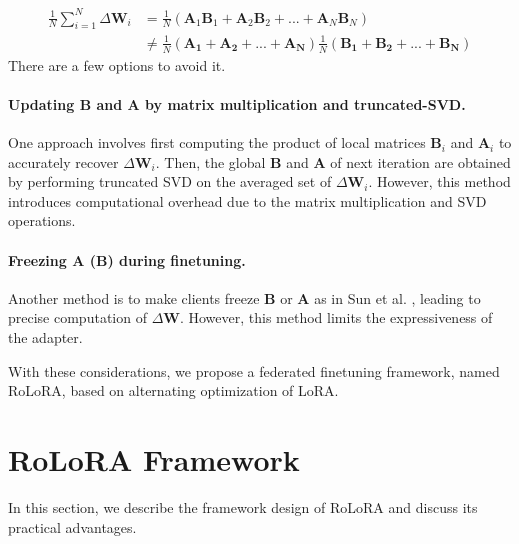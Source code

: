 \documentclass{article}
\theoremstyle{plain}
\theoremstyle{definition}
\theoremstyle{remark}
\begin{document}
\begin{align}
    \frac{1}{N} \sum_{i=1}^N  \Delta \mathbf{W}_i &= \frac{1}{N} (\mathbf{A}_1\mathbf{B}_1+\mathbf{A}_2\mathbf{B}_2+...+ \mathbf{A}_N\mathbf{B}_N) \label{fedavg-mul}\\
    &\neq  \frac{1}{N} (\mathbf{A_1}+\mathbf{A_2}+...+\mathbf{A_N}) \frac{1}{N} (\mathbf{B_1}+\mathbf{B_2}+...+\mathbf{B_N}) \label{fedavg-lora}
\end{align}
There are a few options to avoid it.

    \paragraph{Updating B and A by matrix multiplication and truncated-SVD.} One approach \cite{wang2024florafederatedfinetuninglarge, bai2024federatedfinetuninglargelanguage} involves first computing the product of local matrices $\mathbf{B}_i$ and $\mathbf{A}_i$ to accurately recover $\Delta \mathbf{W}_i$. Then, the global $\mathbf{B}$ and $\mathbf{A}$ of next iteration are obtained by performing truncated SVD on the averaged set of ${\Delta \mathbf{W}_i}$. However, this method introduces computational overhead due to the matrix multiplication and SVD operations.
    \vspace{-0.2cm}
    \paragraph{Freezing A (B) during finetuning.} Another method is to make clients freeze $\mathbf{B}$ or $\mathbf{A}$ as in Sun et al. \cite{sun2024improving}, leading to precise computation of ${\Delta \mathbf{W}}$. However, this method limits the expressiveness of the adapter.


With these considerations, we propose a federated finetuning framework, named RoLoRA, based on alternating optimization of LoRA.
\vspace{-0.3cm}
\section{RoLoRA Framework} 
\label{rolora-framework}
\vspace{-0.3cm}
In this section, we describe the framework design of RoLoRA and discuss its practical advantages. 
\end{document}
